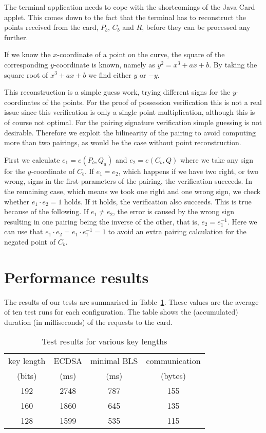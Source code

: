 The terminal application needs to cope with the shortcomings of the Java Card
applet. This comes down to the fact that the terminal has to reconstruct the
points received from the card, $P_b$, $C_b$ and $R$, before they can be
processed any further.

If we know the $x$-coordinate of a point on the curve, the square of the
corresponding $y$-coordinate is known, namely as $y^{2} = x^{3} + ax + b$.
By taking the square root of $x^{3} + ax + b$ we find either $y$ or $-y$.

This reconstruction is a simple guess work, trying different signs for the
$y$-coordinates of the points. For the proof of possession verification this is
not a real issue since this verification is only a single point multiplication,
although this is of course not optimal. For the pairing signature verification
simple guessing is not desirable. Therefore we exploit the bilinearity of the
pairing to avoid computing more than two pairings, as would be the case without
point reconstruction.

First we calculate $e_1 = e(P_b, Q_a)$ and $e_2 = e(C_b, Q)$ where we take any
sign for the $y$-coordinate of $C_b$. If $e_1 = e_2$, which happens if we have
two right, or two wrong, signs in the first parameters of the pairing, the
verification succeeds. In the remaining case, which means we took one right and
one wrong sign, we check whether $e_1 \cdot e_2 = 1$ holds. If it holds, the
verification also succeeds. This is true because of the following. If
$e_1 \neq e_2$, the error is caused by the wrong sign resulting in one pairing
being the inverse of the other, that is, $e_2 = e_1^{-1}$. Here we can use that
$e_1 \cdot e_2 = e_1 \cdot e_1^{-1} = 1$ to avoid an extra pairing calculation
for the negated point of $C_b$.

\section{Performance results}

The results of our tests are summarised in Table~\ref{tab:sbc-results}. These
values are the average of ten test runs for each configuration. The table shows
the (accumulated) duration (in milliseconds) of the requests to the card.

\begin{table}
  \centering
  \caption{Test results for various key lengths}
  \label{tab:sbc-results}
  \renewcommand{\tabcolsep}{1.25mm}
  \renewcommand{\arraystretch}{1.25}
  \begin{tabular}{| c || c | c || c |}\hline
    key length & ECDSA & minimal BLS & communication \\
    (bits) & (ms) & (ms) & (bytes) \\\hline\hline
    192 & 2748 & 787 & 155 \\\hline
    160 & 1860 & 645 & 135 \\\hline
    128 & 1599 & 535 & 115 \\\hline
  \end{tabular}
\end{table}

